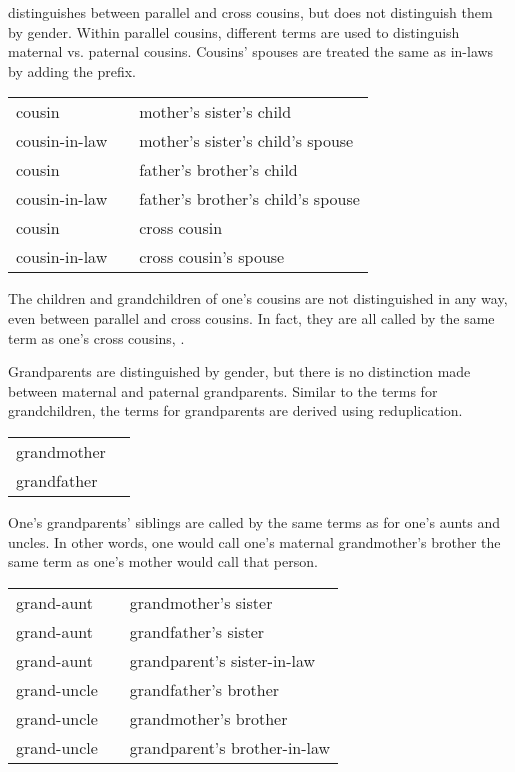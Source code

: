 \lang{} distinguishes between parallel and cross cousins, but does not distinguish them by gender. Within parallel cousins, different terms are used to distinguish maternal vs. paternal cousins. Cousins' spouses are treated the same as in-laws by adding the  prefix.

\exdisplay\noexno
	\begin{tabu} {l l l}
		cousin &  & mother's sister's child\\
		cousin-in-law &  & mother's sister's child's spouse\\
		cousin &  & father's brother's child\\
		cousin-in-law &  & father's brother's child's spouse\\
		cousin &  & cross cousin\\
		cousin-in-law &  & cross cousin's spouse\\
	\end{tabu}
\xe

The children and grandchildren of one's cousins are not distinguished in any way, even between parallel and cross cousins. In fact, they are all called by the same term as one's cross cousins, .

Grandparents are distinguished by gender, but there is no distinction made between maternal and paternal grandparents. Similar to the terms for grandchildren, the terms for grandparents are derived using reduplication.

\exdisplay\noexno
	\begin{tabu} {l l}
		grandmother & \\
		grandfather & \\
	\end{tabu}
\xe

One's grandparents' siblings are called by the same terms as for one's aunts and uncles. In other words, one would call one's maternal grandmother's brother the same term as one's mother would call that person.

\exdisplay\noexno
	\begin{tabu} {l l l}
		grand-aunt &  & grandmother's sister\\
		grand-aunt &  & grandfather's sister\\
		grand-aunt &  & grandparent's sister-in-law\\
		grand-uncle &  & grandfather's brother\\
		grand-uncle &  & grandmother's brother\\
		grand-uncle &  & grandparent's brother-in-law\\
	\end{tabu}
\xe

